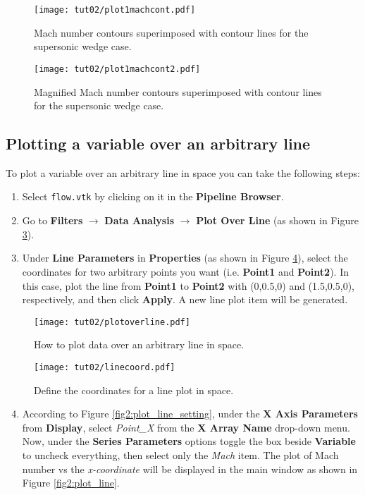 \begin{figure}[ht]
    \centering
    \texttt{[image: tut02/plot1machcont.pdf]}
    \caption{Mach number contours superimposed with contour lines for the supersonic wedge case.}
    \label{fig2:mach_contour}
\end{figure}
\begin{figure}[ht]
    \centering
    \texttt{[image: tut02/plot1machcont2.pdf]}
    \caption{Magnified Mach number contours superimposed with contour lines for the supersonic wedge case.}
    \label{fig2:mach_contour_zoom}
\end{figure}
\subsection{Plotting a variable over an arbitrary line}
To plot a variable over an arbitrary line in space you can take the following steps:
\begin{enumerate}[label=\arabic*)]
	\setcounter{enumi}{0}
	\item Select \texttt{flow.vtk} by clicking on it in the \textbf{Pipeline Browser}.
	\item Go to \textbf{Filters} $\rightarrow$  \textbf{Data Analysis} $\rightarrow$  \textbf{Plot Over Line} (as shown in Figure \ref{fig2:plot_over_line}).
	\item Under \textbf{Line Parameters} in \textbf{Properties} (as shown in Figure \ref{fig2:line_coordinate}), select the coordinates for two arbitrary points you want (i.e. \textbf{Point1} and \textbf{Point2}). In this case, plot the line from \textbf{Point1} to \textbf{Point2} with (0,0.5,0) and (1.5,0.5,0), respectively, and then click \textbf{Apply}. A new line plot item will be generated.
\end{enumerate}
\begin{figure}[H]
	\centering
	\texttt{[image: tut02/plotoverline.pdf]}
	\caption{How to plot data over an arbitrary line in space.}
	\label{fig2:plot_over_line}
\end{figure}
\begin{figure}[ht]
	\centering
	\texttt{[image: tut02/linecoord.pdf]}
	\caption{Define the coordinates for a line plot in space.}
	\label{fig2:line_coordinate}
\end{figure}
\begin{enumerate}[label=\arabic*)]
	\setcounter{enumi}{3}
	\item  According to Figure \ref{fig2:plot_line_setting}, under the \textbf{X Axis Parameters} from \textbf{Display}, select \textit{Point\_X} from the \textbf{X Array Name} drop-down menu. Now, under the \textbf{Series Parameters} options toggle the box beside \textbf{Variable} to uncheck everything, then select only the \textit{Mach} item. The plot of Mach number vs the \textit{x-coordinate} will be displayed in the main window as shown in Figure \ref{fig2:plot_line}.
\end{enumerate}
